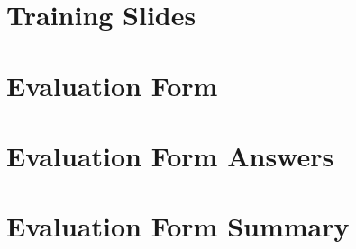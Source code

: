 \chapter{Training Slides}\label{ch:appendix3}


\chapter{Evaluation Form}\label{ch:appendix1}


\chapter{Evaluation Form Answers}\label{ch:appendix4}


\chapter{Evaluation Form Summary}\label{ch:appendix5}



